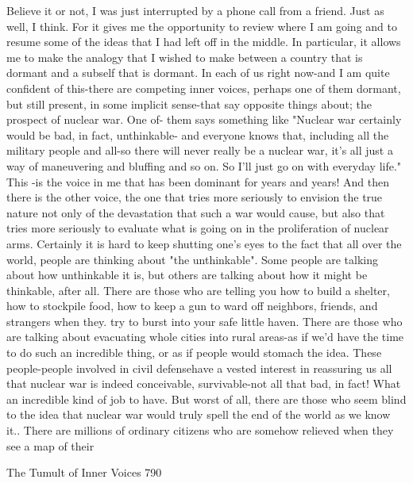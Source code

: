          Believe it or not, I was just interrupted by a phone call from a friend. Just as
well, I think. For it gives me the opportunity to review where I am going and to
resume some of the ideas that I had left off in the middle. In particular, it allows me to
make the analogy that I wished to make between a country that is dormant and a
subself that is dormant. In each of us right now-and I am quite confident of this-there
are competing inner voices, perhaps one of them dormant, but still present, in some
implicit sense-that say opposite things about; the prospect of nuclear war. One of-
them says something like "Nuclear war certainly would be bad, in fact, unthinkable-
and everyone knows that, including all the military people and all-so there will never
really be a nuclear war, it's all just a way of maneuvering and bluffing and so on. So
I'll just go on with everyday life." This -is the voice in me that has been dominant for
years and years! And then there is the other voice, the one that tries more seriously to
envision the true nature not only of the devastation that such a war would cause, but
also that tries more seriously to evaluate what is going on in the proliferation of
nuclear arms.
          Certainly it is hard to keep shutting one's eyes to the fact that all over the
world, people are thinking about "the unthinkable". Some people are talking about
how unthinkable it is, but others are talking about how it might be thinkable, after all.
There are those who are telling you how to build a shelter, how to stockpile food, how
to keep a gun to ward off neighbors, friends, and strangers when they. try to burst into
your safe little haven. There are those who are talking about evacuating whole cities
into rural areas-as if we'd have the time to do such an incredible thing, or as if people
would stomach the idea. These people-people involved in civil defensehave a vested
interest in reassuring us all that nuclear war is indeed conceivable, survivable-not all
that bad, in fact! What an incredible kind of job to have.
          But worst of all, there are those who seem blind to the idea that nuclear war
would truly spell the end of the world as we know it.. There are millions of ordinary
citizens who are somehow relieved when they see a map of their




The Tumult of Inner Voices                                                              790

